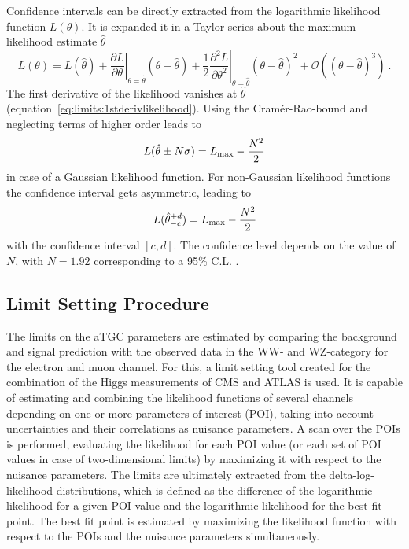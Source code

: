 Confidence intervals can be directly extracted from the logarithmic likelihood function $L(\theta)$. It is expanded it in a Taylor series about the maximum likelihood estimate $\hat{\theta}$ \cite{cowan}
\begin{equation}
L(\theta) = L(\hat{\theta}) + \left. \frac{\partial L}{\partial \theta}\right|_{\theta=\hat{\theta}}(\theta-\hat{\theta}) + \frac{1}{2}\left.\frac{\partial^2L}{\partial \theta^2}\right|_{\theta=\hat{\theta}}(\theta-\hat{\theta})^2 + \mathcal{O}\left((\theta-\hat{\theta})^3\right) ~.
\label{eq:limits:liketaylor}
\end{equation}
The first derivative of the likelihood vanishes at $\hat{\theta}$ (equation~\ref{eq:limits:1stderivlikelihood}). Using the Cram\'{e}r-Rao-bound and neglecting terms of higher order leads to \cite{cowan}
\begin{equation}
L(\hat{\theta}\pm N\sigma) = L_{\rm max} - \frac{N^2}{2} 
\end{equation}
in case of a Gaussian likelihood function. For non-Gaussian likelihood functions the confidence interval gets asymmetric, leading to
\begin{equation}
L(\hat{\theta}_{-c}^{+d}) = L_{\rm max} - \frac{N^2}{2}
\end{equation}
with the confidence interval $[c,d]$. The confidence level depends on the value of $N$, with $N=1.92$ corresponding to a 95\% C.L. \cite{cowan}.

\subsection{Limit Setting Procedure}
\label{subsec:limsetproc}
The limits on the aTGC parameters are estimated by comparing the background and signal prediction with the observed data in the WW- and WZ-category for the electron and muon channel. For this, a limit setting tool created for the combination of the Higgs measurements of CMS and ATLAS \cite{combine} is used. It is capable of estimating and combining the likelihood functions of several channels depending on one or more parameters of interest (POI), taking into account uncertainties and their correlations as nuisance parameters. A scan over the POIs is performed, evaluating the likelihood for each POI value (or each set of POI values in case of two-dimensional limits) by maximizing it with respect to the nuisance parameters. The limits are ultimately extracted from the delta-log-likelihood distributions, which is defined as the difference of the logarithmic likelihood for a given POI value and the logarithmic likelihood for the best fit point. The best fit point is estimated by maximizing the likelihood function with respect to the POIs and the nuisance parameters simultaneously.\\

